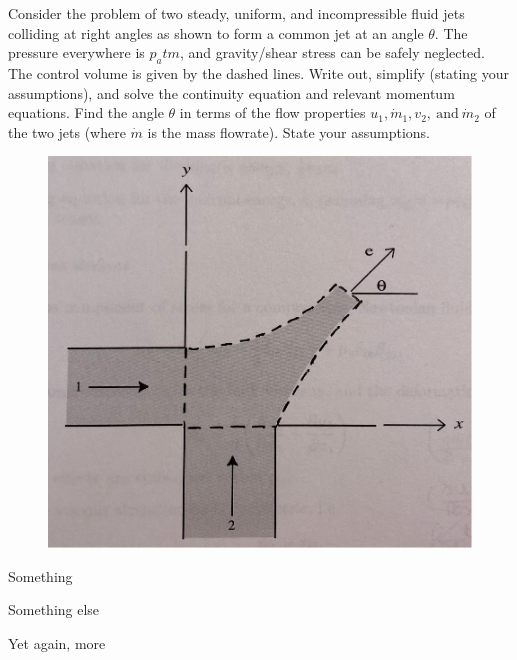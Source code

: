 \documentclass[../main.tex]{subfiles}
\begin{document}

Consider the problem of two steady, uniform, and incompressible fluid jets colliding at right angles as shown to form a common jet at an angle \(\theta\). 
The pressure everywhere is \(p_atm\), and gravity/shear stress can be safely neglected. 
The control volume is given by the dashed lines.
Write out, simplify (stating your assumptions), and solve the continuity equation and relevant momentum equations. 
Find the angle \(\theta\) in terms of the flow properties \(u_1, \dot{m}_1, v_2, \ \textrm{and} \ \dot{m}_2\) of the two jets (where \(\dot{m}\) is the mass flowrate). 
State your assumptions.

\begin{figure}[ht]
    \centering
    \includegraphics[scale=0.5]{images/problem2_diagram.png}
\end{figure}

\givens{}
Something

\assumptions{}
Something else

\solution{}
Yet again, more
\end{document}
